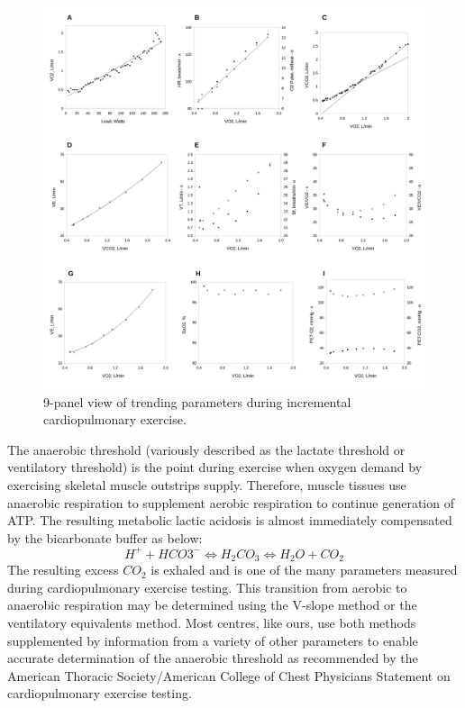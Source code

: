 \begin{figure}[htbp]
	\centering
	\includegraphics[width=\textwidth]{Figures/cpet_9panel.pdf}
	\caption{9-panel view of trending parameters during incremental cardiopulmonary exercise.}
	\label{fig:cpet_9panel}
\end{figure}

The anaerobic threshold (variously described as the lactate threshold or ventilatory threshold) is the point during exercise when oxygen demand by exercising skeletal muscle outstrips supply. Therefore, muscle tissues use anaerobic respiration to supplement aerobic respiration to continue generation of ATP. The resulting metabolic lactic acidosis is almost immediately compensated by the bicarbonate buffer as below: 
\begin{equation} \label{eq:bicarb_buffer}
	H^+ + HCO3^- \Longleftrightarrow H_2CO_3 \Longleftrightarrow H_2O + CO_2
\end{equation}
The resulting excess $CO_2$ is exhaled and is one of the many parameters measured during cardiopulmonary exercise testing. This transition from aerobic to anaerobic respiration may be determined using the V-slope method\parencite{sue_metabolic_1988} or the ventilatory equivalents method.\parencite{beaver_new_1986} Most centres, like ours, use both methods supplemented by information from a variety of other parameters to enable accurate determination of the anaerobic threshold as recommended by the American Thoracic Society/American College of Chest Physicians Statement on cardiopulmonary exercise testing.\parencite{society_ats/accp_2003}

